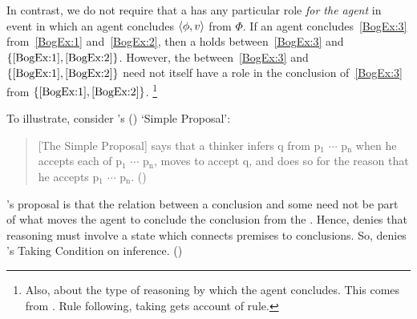 \begin{note}
  In contrast, we do not require that a \ros{} has any particular role \emph{for the agent} in event in which an agent concludes \(\langle \phi, v \rangle\) from \(\Phi\).
  If an agent concludes~\ref{BogEx:3} from~\ref{BogEx:1} and~\ref{BogEx:2}, then a \ros{} holds between~\ref{BogEx:3} and \(\{\ref{BogEx:1}, \ref{BogEx:2}\}\).
  However, the \ros{} between~\ref{BogEx:3} and \(\{\ref{BogEx:1}, \ref{BogEx:2}\}\) need not itself have a role in the \agents{} conclusion of~\ref{BogEx:3} from \(\{\ref{BogEx:1}, \ref{BogEx:2}\}\).%
  \footnote{
    Also, about the type of reasoning by which the agent concludes.
    This comes from \textcite{Boghossian:2008vf,Boghossian:2012vb}.
    Rule following, taking gets account of rule.
  }

  To illustrate, consider \citeauthor{Wright:2014tt}'s (\citeyear{Wright:2014tt}) `Simple Proposal':
  \begin{quote}

    [The Simple Proposal] says that a thinker infers q from p\(_{1}\) \(\cdots\) p\(_{\text{n}}\) when he accepts each of p\(_{1}\) \(\cdots\) p\(_{\text{n}}\), moves to accept q, and does so for the reason that he accepts p\(_{1}\) \(\cdots\) p\(_{\text{n}}\).%
    \mbox{}\hfill\mbox{(\citeyear[33]{Wright:2014tt})}
  \end{quote}

  \noindent%
  \citeauthor{Wright:2014tt}'s proposal is that the relation between a conclusion and some \pool{} need not be part of what moves the agent to conclude the conclusion from the \pool{}.
  Hence, \citeauthor{Wright:2014tt} denies that reasoning must involve a state which connects premises to conclusions.
  So, \citeauthor{Wright:2014tt} denies \citeauthor{Boghossian:2008vf}'s Taking Condition on inference.
  (\citeyear[Cf.][33-34]{Wright:2014tt})


\end{note}
